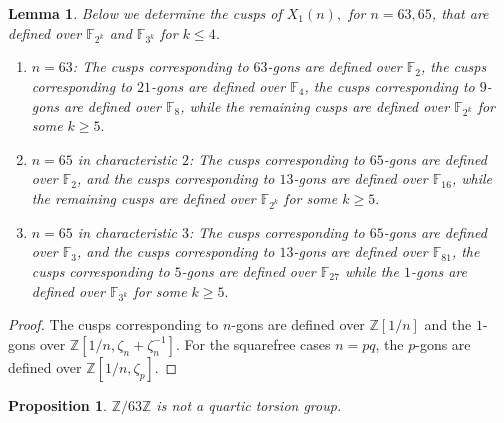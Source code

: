 \documentclass[11pt,reqno]{amsart}
\newtheorem{lemma}[theorem]{Lemma}
\newtheorem{proposition}[theorem]{Proposition}
\theoremstyle{definition}
\numberwithin{equation}{section}
\newcommand{\Z}{\mathbb{Z}}
\newcommand{\F}{\mathbb{F}}
\def\torz#1{\mathbb Z /#1 \mathbb Z}
\begin{document}
\begin{lemma} \label{lem:cusps}Below we determine the cusps of $X_1(n),$ for $n=63, 65$, that are defined over $\F_{2^k}$  and $\F_{3^k}$ for $k\leq 4$.
    \begin{enumerate}
        \item $n=63$: The cusps corresponding to $63$-gons are defined over $\F_2$, the cusps corresponding to $21$-gons are defined over $\F_4$, the cusps corresponding to $9$-gons are defined over $\F_8$, while the remaining cusps are defined over $\F_{2^k}$ for some $k\geq 5.$
        \item $n=65$ in characteristic $2$:  The cusps corresponding to $65$-gons are defined over $\F_2$, and the cusps corresponding to $13$-gons are defined over $\F_{16}$, while the remaining cusps are defined over $\F_{2^k}$ for some $k\geq 5.$
        \item $n=65$ in characteristic $3$:  The cusps corresponding to $65$-gons are defined over $\F_3$, and the cusps corresponding to $13$-gons are defined over $\F_{81}$, the cusps corresponding to $5$-gons are defined over $\F_{27}$ while the $1$-gons are defined over $\F_{3^k}$ for some $k\geq 5.$
    \end{enumerate}
\end{lemma}
\begin{proof}
 The cusps corresponding to $n$-gons are defined over $\Z[1/n]$ and the $1$-gons over $\Z[1/n, \zeta_{n}+\zeta_{n}^{-1}]$. For the squarefree cases $n=pq$, the $p$-gons are defined over $\Z[1/n, \zeta_p]$. 
\end{proof}


\begin{proposition}\label{prop:63}
    $\torz{63}$ is not a quartic torsion group.
\end{proposition}
\end{document}
